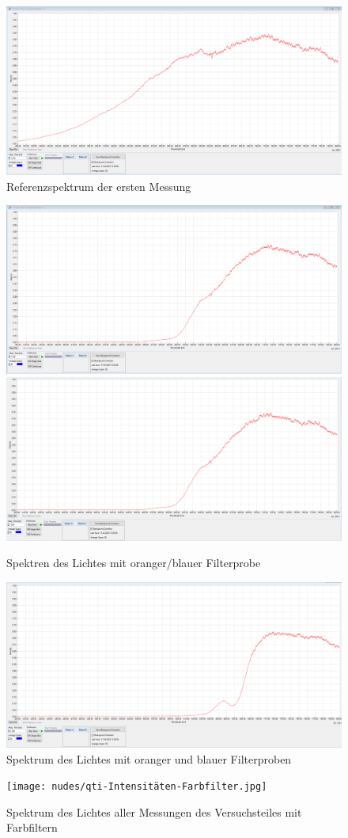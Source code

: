 \documentclass[12pt,a4paper,twoside]{article}
\begin{document}
\begin{figure}[H]
    \centering
    \includegraphics[width=0.4\linewidth]{nudes/Verlauf-Referenzspektrum.PNG}
    \caption{Referenzspektrum der ersten Messung}
    \label{fig:Referenzspektrum3.1Bild}
\end{figure}

\begin{figure}[H]
    \centering
    \includegraphics[width=0.4\linewidth]{nudes/Verlauf-Rot.PNG}
    \includegraphics[width=0.4\linewidth]{nudes/Verlauf-Blau.PNG}
    \caption{Spektren des Lichtes mit oranger/blauer Filterprobe}
    \label{fig:Orange/Blau3.1Bilder}
\end{figure}

\begin{figure}[H]
    \centering
    \includegraphics[width=0.4\linewidth]{nudes/Verlauf-BlauUndRot.PNG}
    \caption{Spektrum des Lichtes mit oranger und blauer Filterproben}
    \label{fig:OrangeUndBlau3.1Bilder}
\end{figure}

\begin{figure}[H]
    \centering
    \texttt{[image: nudes/qti-Intensitäten-Farbfilter.jpg]}
    \caption{Spektrum des Lichtes aller Messungen des Versuchsteiles mit Farbfiltern}
    \label{fig:Alle3.1Bilder}
\end{figure}
\end{document}

